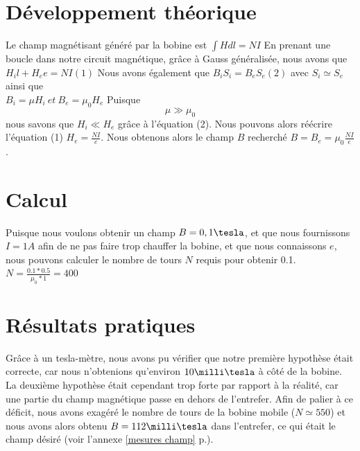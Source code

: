 \section{Développement théorique}
Le champ magnétisant généré par la bobine est 
$\int{H dl} = N I$
En prenant une boucle dans notre circuit magnétique, grâce à Gauss généralisée, nous avons que
$H_i l + H_e e = N I (1)$
Nous avons également que $B_i S_i = B_e S_e (2)$  avec $S_i \simeq S_e$
ainsi que \\
$B_i = \mu H_i \:et\:  B_e = \mu_0 H_e$
Puisque \[\mu \gg \mu_0\]nous savons que $H_i \ll H_e$ grâce à l'équation (2).
Nous pouvons alors réécrire l'équation (1) $H_e = \frac{N I}{e}$.
Nous obtenons alors le champ $B$ recherché $B = B_e = \mu_0 \frac{N I}{e}$.
\section{Calcul}
Puisque nous voulons obtenir un champ $B = 0,1 \tesla$, et que nous fournissons $I = 1 A$ afin de ne pas faire trop 
chauffer la bobine, et que nous connaissons $e$, nous pouvons calculer le nombre de tours $N$ requis pour obtenir 0.1\tesla.
$N = \frac{0.1 * 0.5}{\mu_0 * 1} = 400$
\section{Résultats pratiques}
Grâce à un tesla-mètre, nous avons pu vérifier que notre première hypothèse était correcte, car nous n'obtenions 
qu'environ $10 \milli\tesla$ à côté de la bobine. 
\\La deuxième hypothèse était cependant trop forte par rapport à la réalité, car une 
partie du champ magnétique passe en dehors de l'entrefer. Afin de palier à ce déficit, nous avons exagéré le nombre de 
tours de la bobine mobile ($N \simeq 550$) et nous avons alors obtenu $B = 112 \milli\tesla$ dans l'entrefer, 
ce qui était le champ désiré (voir l'annexe \ref{mesures champ} p.\pageref{mesures champ}).
